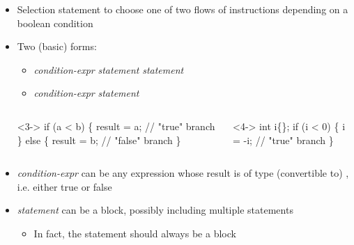 \begin{frame}[fragile]{}

  \begin{itemize}
  \item<1-> Selection statement to choose one of two flows of instructions
    depending on a boolean condition
  \item<2-> Two (basic) forms:
    \begin{itemize}
    \item<3->  \textit{condition-expr} \code{)} \textit{statement}  \textit{statement}
    \item<4->  \textit{condition-expr} \code{)} \textit{statement}
    \end{itemize}

  \begin{columns}[t]

    \begin{column}{.45\textwidth}

      \begin{codeblock}<3->{
\alert{if} (a < b) \{
  result = a;   // "true" branch
\} \alert{else} \{
  result = b;   // "false" branch
\}}\end{codeblock}

    \end{column}

    \begin{column}{.45\textwidth}
      \begin{codeblock}<4->{
int i\{\ddd\};
\alert{if} (i < 0) \{
  i = -i;   // "true" branch
\}}\end{codeblock}

    \end{column}

  \end{columns}

  \item<5-> \textit{condition-expr} can be any expression whose result is of type
    (convertible to) , i.e. either true or false

  \item<6-> \textit{statement} can be a block, possibly including multiple
    statements
    \begin{itemize}
    \item In fact, the statement should always be a block
    \end{itemize}
  \end{itemize}

\end{frame}

